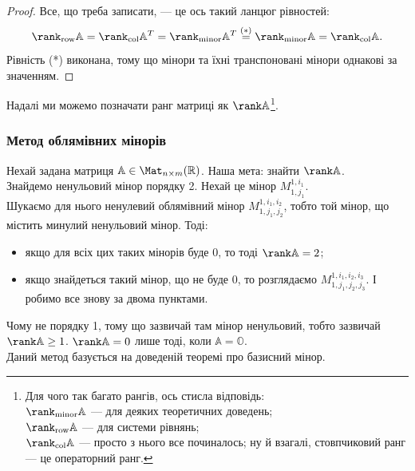 \documentclass{math_library}
\begin{document}
\begin{proof}
Все, що треба записати, --- це ось такий ланцюг рівностей:
\[
\rank_{\textrm{row}} \mathbb{A} = \rank_{\textrm{col}} \mathbb{A}^T = \rank_{\textrm{minor}} \mathbb{A}^T \overset{(*)}{=} \rank_{\textrm{minor}} \mathbb{A} = \rank_{\textrm{col}} \mathbb{A}.
\]
Рівність (*) виконана, тому що мінори та їхні транспоновані мінори однакові за значенням.
\end{proof}

\begin{remark}
Надалі ми можемо позначати ранг матриці як $\rank \mathbb{A}$\footnote{Для чого так багато рангів, ось стисла відповідь:\\
$\rank_{\textrm{minor}} \mathbb{A}$ --- для деяких теоретичних доведень;\\
$\rank_{\textrm{row}} \mathbb{A}$ --- для системи рівнянь;\\
$\rank_{\textrm{col}} \mathbb{A}$ --- просто з нього все починалось; ну й взагалі, стовпчиковий ранг --- це операторний ранг.}.
\end{remark}

\subsubsection*{Метод облямівних мінорів}
Нехай задана матриця $\mathbb{A} \in \Mat_{n \times m}(\mathbb{R})$. Наша мета: знайти $\rank \mathbb{A}$.\\
Знайдемо ненульовий мінор порядку 2. Нехай це мінор $M_{1,j_1}^{1,i_1}$.\\
Шукаємо для нього ненулевий облямівний мінор $M_{1,j_1,j_2}^{1,i_1,i_2}$, тобто той мінор, що містить минулий ненульовий мінор. Тоді:
\begin{itemize}[nosep,wide=0pt,label={--}]
\item якщо для всіх цих таких мінорів буде 0, то тоді $\rank \mathbb{A} = 2$;
\item якщо знайдеться такий мінор, що не буде 0, то розглядаємо $M_{1,j_1,j_2,j_3}^{1,i_1,i_2,i_3}$. І робимо все знову за двома пунктами.
\end{itemize}
Чому не порядку 1, тому що зазвичай там мінор ненульовий, тобто зазвичай $\rank \mathbb{A} \geq 1$. $\rank \mathbb{A} = 0$ лише тоді, коли $\mathbb{A} = \mathbb{O}$.
\bigskip \\
Даний метод базується на доведеній теоремі про базисний мінор.
\end{document}
